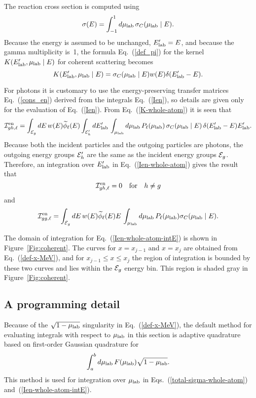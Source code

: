 The reaction cross section is computed using
\begin{equation}
  \sigma( E) = \int_{-1}^1 d\mu_{\text{lab}} \, \sigma_C(\mu_{\text{lab}} \mid E).
  \label{total-sigma-whole-atom}
\end{equation}
Because the energy is assumed to be unchanged, $E_{\text{lab}}' = E$, and
because the gamma multiplicity is~1,
the formula Eq.~(\ref{def_pi}) for the kernel 
$K(E_{\text{lab}}', \mu_{\text{lab}} \mid E)$ for coherent scattering becomes
\begin{equation}
   K(E_{\text{lab}}', \mu_{\text{lab}} \mid E) = \sigma_C(\mu_{\text{lab}} \mid E) w(E) \delta( E_{\text{lab}}' - E).
  \label{K-whole-atom}
\end{equation}

For photons it is customary to use the energy-preserving transfer
matrices Eq.~(\ref{cons_en}) derived from the integrals Eq.~(\ref{Ien}),
so details are given only for the evaluation of Eq.~(\ref{Ien}).
From Eq.~(\ref{K-whole-atom}) it is seen that
\begin{equation}
    {\cal I}^{\text{en}}_{gh,\ell} =
     \int_{{\cal E}_g} dE \, w(E) \widetilde \phi_\ell(E)
     \int_{{\cal E}_h' } dE_{\text{lab}}' \, \int_{\mu_{\text{lab}}} d\mu_{\text{lab}}  \, 
     P_\ell ( \mu_{\text{lab}} )\, \sigma_C(\mu_{\text{lab}} \mid E)
      \, \delta( E_{\text{lab}}' - E) E_{\text{lab}}'.
  \label{Ien-whole-atom}
\end{equation}
Because both the incident particles and the outgoing particles are
photons, the outgoing energy groups ${\cal E}_h'$ are the same as the
incident energy groups ${\cal E}_g$.  Therefore, an integration over
$E_{\text{lab}}'$ in Eq.~(\ref{Ien-whole-atom}) gives the result that
$$
  {\cal I}^{\text{en}}_{gh,\ell} = 0 \quad \textrm{for} \quad h \ne g
$$
and
\begin{equation}
   {\cal I}^{\text{en}}_{gg,\ell} =
   \int_{{\cal E}_g} dE \, w(E)  \widetilde \phi_\ell(E) E \,
   \int_{\mu_{\text{lab}}} d\mu_{\text{lab}}  \, P_\ell ( \mu_{\text{lab}} ) \sigma_C(\mu_{\text{lab}} \mid E).
  \label{Ien-whole-atom-intE}
\end{equation}

\begin{figure}

\end{figure}

The domain of integration for Eq.~(\ref{Ien-whole-atom-intE}) is
shown in Figure~\ref{Fig:coherent}.  The curves for $x = x_{j-1}$ and $x = x_j$
are obtained from Eq.~(\ref{def-x-MeV}), and for $x_{j-1} \le x \le x_j$
the region of integration is bounded by these two curves and
lies within the ${\cal E}_g$ energy bin.  This region is shaded gray in
Figure~\ref{Fig:coherent}.

\subsection{A programming detail}
Because of the $\sqrt{1 - \mu_{\text{lab}}}$ singularity in Eq.~(\ref{def-x-MeV}),
the default method for evaluating integrals with respect to $\mu_{\text{lab}}$ in 
this section is adaptive quadrature based on first-order Gaussian quadrature
for
\begin{equation}
  \int_a^b d\mu_{\text{lab}} \, F(\mu_{\text{lab}}) \sqrt{ 1 - \mu_{\text{lab}}}.
 \label{Gauss-quad-half}
\end{equation}
This method is used for integration over $\mu_{\text{lab}}$ in 
Eqs.~(\ref{total-sigma-whole-atom}) and~(\ref{Ien-whole-atom-intE}).

